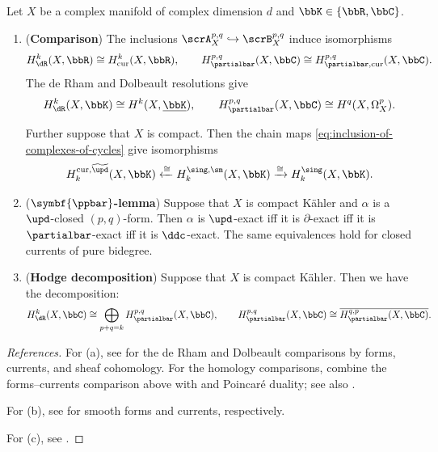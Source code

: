\begin{theorem}[label=\labelNFM{thm:cohomology-by-forms-and-currents}, status=draft, tag=0000000]
	Let $X$ be a complex manifold of complex dimension $d$ and $\bbK \in \{\bbR,\bbC\}$.
	\begin{enumerate}
		\item (\textbf{Comparison}) The inclusions $\scrA_X^{p,q} \hookrightarrow \scrB_X^{p,q}$ induce isomorphisms
		      \[ H_\dR^k(X,\bbR) \cong H_\mathrm{cur}^k(X,\bbR),\qquad H_{\partialbar}^{p,q}(X,\bbC) \cong H_{\partialbar,\mathrm{cur}}^{p,q}(X,\bbC). \]
		      The de Rham and Dolbeault resolutions give
		      \[ H_\dR^k(X,\bbK) \cong H^k(X,\underline{\bbK}),\qquad H_{\partialbar}^{p,q}(X,\bbC) \cong H^q(X,\Omega_X^p). \]

		      Further suppose that $X$ is compact.
		      Then the chain maps \cref{eq:inclusion-of-complexes-of-cycles} give isomorphisms
		      \[ H_k^{\mathrm{cur},\widetilde{\upd}}(X,\bbK) \xleftarrow{ \cong } H_k^{\sing,\sm}(X,\bbK) \xrightarrow{ \cong } H_k^\sing(X,\bbK). \]

		\item (\textbf{$\symbf{\ppbar}$-lemma}) Suppose that $X$ is compact K\"ahler and $\alpha$ is a $\upd$-closed $(p,q)$-form.
		      Then $\alpha$ is $\upd$-exact iff it is $\partial$-exact iff it is $\partialbar$-exact iff it is $\ddc$-exact.
		      The same equivalences hold for closed currents of pure bidegree.
		\item (\textbf{Hodge decomposition}) Suppose that $X$ is compact K\"ahler.
		      Then we have the decomposition:
		      \[ H_\dR^k(X,\bbC) \cong \bigoplus_{p+q = k} H_{\partialbar}^{p,q}(X,\bbC),\qquad H_{\partialbar}^{p,q}(X,\bbC)  \cong  \overline{H_{\partialbar}^{q,p}(X,\bbC)}. \]

	\end{enumerate}
\end{theorem}
\begin{proof}[References]
	For (a), see \cite[Chapter~IV, \S 6, (6.7)--(6.8), (6.15), and (6.17)]{Demailly-2012-ComplexAnalyticDifferential} for the de Rham and Dolbeault comparisons by forms, currents, and sheaf cohomology.
	For the homology comparisons, combine the forms--currents comparison above with \cite[Chapter~18, Theorem~18.7]{Lee-2012-IntroductionSmoothManifolds} and  Poincar\'e duality; see also \cite[Chapter II, Section 6.6]{Pham-2011-SingularitiesIntegralsHomology}.

	For (b), see \cite[\S 2.4.C, Proposition~2.4.3 and Corollary~2.4.5]{Chambert-Loir-2012-ArakelovGeometryHeights} for smooth forms and currents, respectively.

	For (c), see \cite[Chapter~VI, \S 8.2, Theorem~8.5]{Demailly-2012-ComplexAnalyticDifferential}.
\end{proof}

